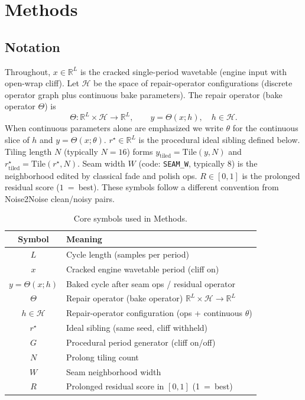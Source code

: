 \section{Methods}
\label{sec:methods}

\subsection{Notation}
\label{sec:notation}

Throughout, $x\in\mathbb{R}^{L}$ is the cracked single-period wavetable (engine input with open-wrap cliff).
Let $\mathcal{H}$ be the space of repair-operator configurations (discrete operator graph plus continuous bake parameters).
The repair operator (bake operator $\Theta$) is
\begin{equation}
\label{eq:Theta}
\Theta:\mathbb{R}^{L}\times\mathcal{H}\to\mathbb{R}^{L},\qquad
y=\Theta(x;h),\quad h\in\mathcal{H}.
\end{equation}
When continuous parameters alone are emphasized we write $\theta$ for the continuous slice of $h$ and $y=\Theta(x;\theta)$.
$r^{\star}\in\mathbb{R}^{L}$ is the procedural ideal sibling defined below.
Tiling length $N$ (typically $N{=}16$) forms $y_{\mathrm{tiled}}=\mathrm{Tile}(y,N)$ and $r^{\star}_{\mathrm{tiled}}=\mathrm{Tile}(r^{\star},N)$.
Seam width $W$ (code: \texttt{SEAM\_W}, typically $8$) is the neighborhood edited by classical fade and polish ops.
$R\in[0,1]$ is the prolonged residual score ($1$~=~best).
These symbols follow a different convention from Noise2Noise clean/noisy pairs.

\begin{table}[t]
  \centering
  \caption{Core symbols used in Methods.}
  \label{tab:symbols}
  \setlength{\tabcolsep}{3pt}
  \begin{tabular}{@{}cl@{}}
    \toprule
    Symbol & Meaning \\
    \midrule
    $L$ & Cycle length (samples per period) \\
    $x$ & Cracked engine wavetable period (cliff on) \\
    $y=\Theta(x;h)$ & Baked cycle after seam ops / residual operator \\
    $\Theta$ & Repair operator (bake operator) $\mathbb{R}^{L}\times\mathcal{H}\to\mathbb{R}^{L}$ \\
    $h\in\mathcal{H}$ & Repair-operator configuration (ops + continuous $\theta$) \\
    $r^{\star}$ & Ideal sibling (same seed, cliff withheld) \\
    $G$ & Procedural period generator (cliff on/off) \\
    $N$ & Prolong tiling count \\
    $W$ & Seam neighborhood width \\
    $R$ & Prolonged residual score in $[0,1]$ (1~=~best) \\
    \bottomrule
  \end{tabular}
\end{table}

